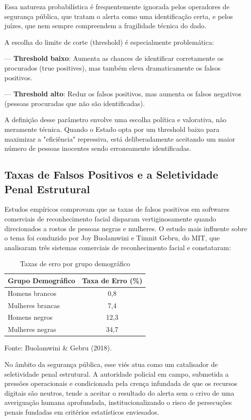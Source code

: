 \documentclass[12pt,a4paper]{article}
\begin{document}
Essa natureza probabilística é frequentemente ignorada pelos operadores de segurança pública, que tratam o alerta como uma identificação certa, e pelos juízes, que nem sempre compreendem a fragilidade técnica do dado.

A escolha do limite de corte (threshold) é especialmente problemática:

--- \textbf{Threshold baixo}: Aumenta as chances de identificar corretamente os procurados (true positives), mas também eleva dramaticamente os falsos positivos.

--- \textbf{Threshold alto}: Reduz os falsos positivos, mas aumenta os falsos negativos (pessoas procuradas que não são identificadas).

A definição desse parâmetro envolve uma escolha política e valorativa, não meramente técnica. Quando o Estado opta por um threshold baixo para maximizar a "eficiência" repressiva, está deliberadamente aceitando um maior número de pessoas inocentes sendo erroneamente identificadas.

\subsection{Taxas de Falsos Positivos e a Seletividade Penal Estrutural}

Estudos empíricos comprovam que as taxas de falsos positivos em softwares comerciais de reconhecimento facial disparam vertiginosamente quando direcionados a rostos de pessoas negras e mulheres. O estudo mais influente sobre o tema foi conduzido por Joy Buolamwini e Timnit Gebru, do MIT, que analisaram três sistemas comerciais de reconhecimento facial e constataram:

\begin{table}[H]
\centering
\begin{tabular}{|l|c|}
\hline
\textbf{Grupo Demográfico} & \textbf{Taxa de Erro (\%)} \\
\hline
Homens brancos & 0,8 \\
Mulheres brancas & 7,4 \\
Homens negros & 12,3 \\
Mulheres negras & 34,7 \\
\hline
\end{tabular}
\caption{Taxas de erro por grupo demográfico}
\label{tab:erros}
\par\medskip
Fonte: Buolamwini \& Gebru (2018).
\end{table}

No âmbito da segurança pública, esse viés atua como um catalisador de seletividade penal estrutural. A autoridade policial em campo, submetida a pressões operacionais e condicionada pela crença infundada de que os recursos digitais são neutros, tende a aceitar o resultado do alerta sem o crivo de uma averiguação humana aprofundada, institucionalizando o risco de persecuções penais fundadas em critérios estatísticos enviesados.
\end{document}
